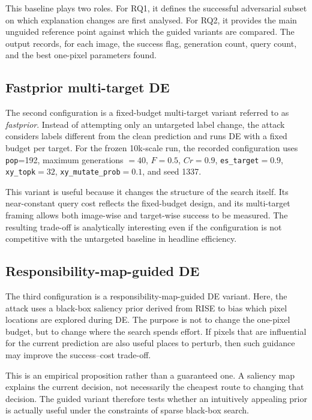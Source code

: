 This baseline plays two roles.
For RQ1, it defines the successful adversarial subset on which explanation changes are first analysed.
For RQ2, it provides the main unguided reference point against which the guided variants are compared.
The output records, for each image, the success flag, generation count, query count, and the best one-pixel parameters found.

\subsection{Fastprior multi-target DE}
The second configuration is a fixed-budget multi-target variant referred to as \emph{fastprior}.
Instead of attempting only an untargeted label change, the attack considers labels different from the clean prediction and runs DE with a fixed budget per target.
For the frozen 10k-scale run, the recorded configuration uses \texttt{pop}=192, maximum generations $=40$, $F=0.5$, $Cr=0.9$, \texttt{es\_target}$=0.9$, \texttt{xy\_topk}$=32$, \texttt{xy\_mutate\_prob}$=0.1$, and seed 1337.

This variant is useful because it changes the structure of the search itself.
Its near-constant query cost reflects the fixed-budget design, and its multi-target framing allows both image-wise and target-wise success to be measured.
The resulting trade-off is analytically interesting even if the configuration is not competitive with the untargeted baseline in headline efficiency.

\subsection{Responsibility-map-guided DE}
The third configuration is a responsibility-map-guided DE variant.
Here, the attack uses a black-box saliency prior derived from RISE \cite{petsiuk2018rise} to bias which pixel locations are explored during DE.
The purpose is not to change the one-pixel budget, but to change where the search spends effort.
If pixels that are influential for the current prediction are also useful places to perturb, then such guidance may improve the success--cost trade-off.

This is an empirical proposition rather than a guaranteed one.
A saliency map explains the current decision, not necessarily the cheapest route to changing that decision.
The guided variant therefore tests whether an intuitively appealing prior is actually useful under the constraints of sparse black-box search.

